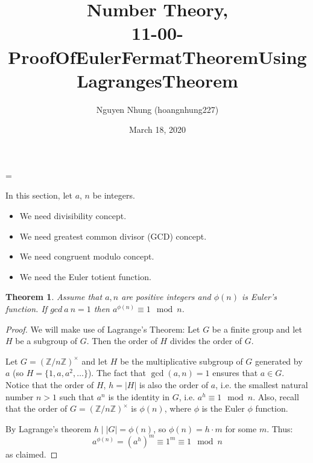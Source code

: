 \documentclass[12pt]{article}
\title{Number Theory,\\ 11-00-ProofOfEulerFermatTheoremUsingLagrangesTheorem}
\date{March 18, 2020}
\author{Nguyen Nhung (hoangnhung227)}
\newtheorem{theorem}[definition]{Theorem}
\numberwithin{definition}{section}
\newcommand{\Ints}{\mathbb{Z}}
\begin{document}
	
	\parskip=\baselineskip
	
	\begin{cnl}
		
		\bigskip
		
		In this section, let $a$, $n$ be integers.

\begin{remark}
	\begin{itemize}
		\item We need divisibility concept.
		\item We need greatest common divisor (GCD) concept.
		\item We need congruent modulo concept.
		\item We need the Euler totient function.
	\end{itemize}
\end{remark}


\begin{theorem}
	Assume that $a, n$ are positive integers and $\phi(n)$ is Euler's function. If $gcd \ a\ n =1$  then $a^{\phi (n)} \equiv 1 \mod n$.
\end{theorem}

\begin{remark}
\begin{proof}
We will make use of Lagrange's Theorem: Let $G$ be a finite group and let $H$ be a subgroup of $G$. Then the order of $H$ divides the order of $G$.

Let $G=(\Ints/n\Ints)^\times$ and let $H$ be the multiplicative subgroup of $G$ generated by $a$ (so $H=\{ 1, a ,a^2,\ldots \}$). The fact that $\gcd(a,n)=1$ ensures that $a\in G$. Notice that the order of $H$, $h=|H|$ is also the order of $a$, i.e. the smallest natural number $n>1$ such that $a^n$ is the identity in $G$, i.e. $a^h\equiv 1 \mod n$. Also, recall that the order of $G=(\Ints/n\Ints)^\times$ is $\phi(n)$, where $\phi$ is the Euler $\phi$ function.

By Lagrange's theorem $h \mid |G|=\phi(n)$, so $\phi(n)=h\cdot m$ for some $m$. Thus:
$$a^{\phi(n)}=(a^h)^m\equiv 1^m \equiv 1 \mod n$$
as claimed.

\end{proof}
\end{remark}
\end{cnl}
\end{document}
